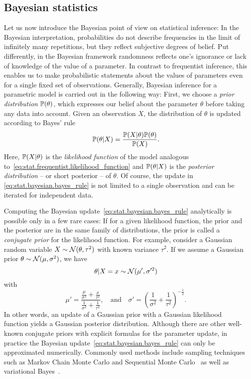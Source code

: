 \subsection{Bayesian statistics}%
\label{sub:stat.bayesian}


Let us now introduce the Bayesian point of view on statistical inference:
In the Bayesian interpretation, probabilities do not describe frequencies in the limit of infinitely many repetitions, but they reflect subjective degrees of belief.
Put differently, in the Bayesian framework randomness reflects one's ignorance or lack of knowledge of the value of a parameter.
In contrast to frequentist inference, this enables us to make probabilistic statements about the values of parameters even for a single fixed set of observations.
Generally, Bayesian inference for a parametric model is carried out in the following way:
First, we choose a \emph{prior distribution} $\mathbb{P}(\theta)$, which expresses our belief about the parameter $\theta$ before taking any data into account.
Given an observation $X$, the distribution of $\theta$ is updated according to Bayes' rule~\cite{Bolstad_2007_Introduction,Gelman_2014_Bayesian}
\[
  \label{eq:stat.bayesian.bayes_rule}
  \mathbb{P}(\theta | X) = \frac{\mathbb{P}(X | \theta) \mathbb{P}(\theta)}{\mathbb{P}(X)}.
\]
Here, $\mathbb{P}(X|\theta)$ is the \emph{likelihood function} of the model analogous to~\eqref{eq:stat.frequentist.likelihood_function} and $\mathbb{P}(\theta | X)$ is the \emph{posterior distribution} -- or short posterior -- of $\theta$.
Of course, the update in \cref{eq:stat.bayesian.bayes_rule} is not limited to a single observation and can be iterated for independent data.

Computing the Bayesian update~\eqref{eq:stat.bayesian.bayes_rule} analytically is possible only in a few rare cases:
If for a given likelihood function, the prior and the posterior are in the same family of distributions, the prior is called a \emph{conjugate prior} for the likelihood function.
For example, consider a Gaussian random variable $X \sim \mathcal{N}(\theta, \tau^2)$ with known variance $\tau^2$.
If we assume a Gaussian prior $\theta \sim \mathcal{N}(\mu, \sigma^2)$, we have~\cite[Eq.\ (2.10)]{Gelman_2014_Bayesian}
\[
  \theta \vert X=x \sim \mathcal{N} (\mu', \sigma'^2)
\]
with
\[
  \label{eq:stat.bayesian.kalman}
  \mu' = \frac{ \frac{\mu}{\sigma^2} + \frac{x}{\tau^2} }{ \frac{1}{\sigma^2} + \frac{1}{\tau^2} },
  \quad\mbox{and}\quad
  \sigma' = \left( \frac{1}{\sigma^2} + \frac{1}{\tau^2} \right)^{- \tfrac{1}{2}}.
\]
In other words, an update of a Gaussian prior with a Gaussian likelihood function yields a Gaussian posterior distribution.
Although there are other well-known conjugate priors with explicit formulas for the parameter update, in practice the Bayesian update~\eqref{eq:stat.bayesian.bayes_rule} can only be approximated numerically.
Commonly used methods include sampling techniques such as Markov Chain Monte Carlo and Sequential Monte Carlo~\cite{Gelman_2014_Bayesian} as well as variational Bayes~\cite{Fox_2012_Tutorial}.\\


